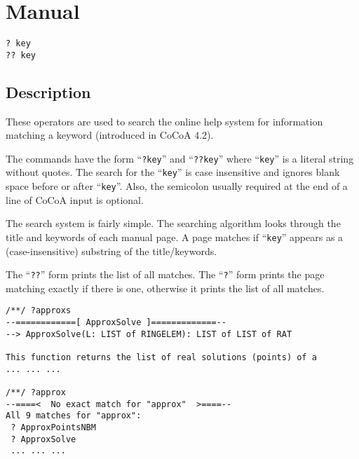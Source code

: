 \documentclass[a4paper]{mybook}
\newenvironment{command}{}{} %
\begin{document}
\section{Manual}
\label{Manual}
\begin{command} %


\begin{Verbatim}[label=syntax, rulecolor=\color{MidnightBlue},
frame=single]
? key
?? key
\end{Verbatim}


\subsection*{Description}

These operators are used to search the online help system for
information matching a keyword (introduced in CoCoA 4.2).
\par 
The commands have the form ``\verb&?key&'' and ``\verb&??key&'' where ``\verb&key&'' is a
literal string without quotes.
The search for the ``\verb&key&'' is case insensitive and ignores blank space
before or after ``\verb&key&''.  Also, the semicolon usually required at the end
of a line of CoCoA input is optional.
\par 
The search system is fairly simple.  The searching algorithm looks through
the title and keywords of each manual page.  A page matches if ``\verb&key&''
appears as a (case-insensitive) substring of the title/keywords.
\par 
The ``\verb&??&'' form prints the list of all matches.
The ``\verb&?&'' form prints the page matching exactly if there is one,
otherwise it prints the list of all matches.
\par 
\begin{Verbatim}[label=example, rulecolor=\color{PineGreen}, frame=single]
/**/ ?approxs
--============[ ApproxSolve ]=============--
--> ApproxSolve(L: LIST of RINGELEM): LIST of LIST of RAT

This function returns the list of real solutions (points) of a
... ... ...

/**/ ?approx
--====<  No exact match for "approx"  >====--
All 9 matches for "approx":
 ? ApproxPointsNBM
 ? ApproxSolve
 ... ... ...

\end{Verbatim}


\end{command} %
\end{document}
